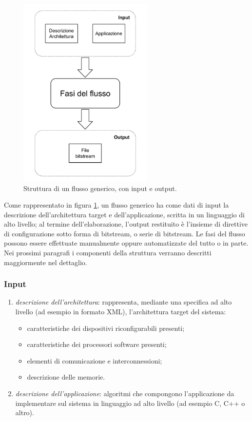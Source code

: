 \begin{figure}[t]
  \begin{center}
    \includegraphics[width=0.6\textwidth]{./capitoli/figure/cap1/StrutturaFlusso.pdf}
    \caption{Struttura di un flusso generico, con input e output.}
    \label{fig:strutturaFlusso}
  \end{center}
\end{figure}

Come rappresentato in figura \ref{fig:strutturaFlusso}, un flusso generico ha come dati di input la descrizione
dell'architettura target e dell'applicazione, scritta in un linguaggio di alto livello;
al termine dell'elaborazione, l'output restituito \`e l'insieme di direttive di configurazione sotto forma
di bitstream, o serie di bitstream. Le fasi del flusso possono essere effettuate manualmente
oppure automatizzate del tutto o in parte. Nei prossimi paragrafi i componenti della struttura verranno descritti
maggiormente nel dettaglio.

\subsubsection{Input}
\begin{enumerate}
  \item \emph{descrizione dell'architettura}: rappresenta, mediante una specifica ad alto livello (ad esempio
    in formato XML), l'architettura target del sistema:
    \begin{itemize}
      \item caratteristiche dei dispositivi riconfigurabili presenti;
      \item caratteristiche dei processori software presenti;
      \item elementi di comunicazione e interconnessioni;
      \item descrizione delle memorie.
    \end{itemize}
  \item \emph{descrizione dell'applicazione}: algoritmi che compongono l'applicazione da implementare sul sistema
    in linguaggio ad alto livello (ad esempio C, C++ o altro).
\end{enumerate}

